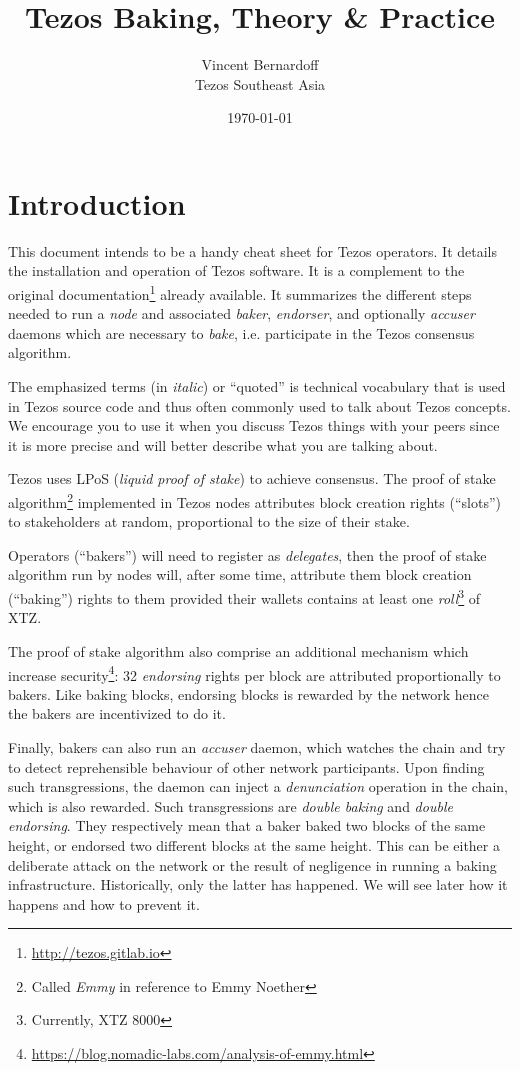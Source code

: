 \documentclass[a4paper,twocolumn,10pt]{article}
\title{Tezos Baking, Theory \& Practice}
\date{\today}
\author{
  Vincent Bernardoff\\
  Tezos Southeast Asia
}
\begin{document}
\twocolumn
\maketitle
\tableofcontents
\section{Introduction}

This document intends to be a handy cheat sheet for Tezos
operators. It details the installation and operation of Tezos
software. It is a complement to the original
documentation\footnote{\url{http://tezos.gitlab.io}} already
available. It summarizes the different steps needed to run a
\emph{node} and associated \emph{baker}, \emph{endorser}, and
optionally \emph{accuser} daemons which are necessary to \emph{bake},
i.e. participate in the Tezos consensus algorithm.

The emphasized terms (in \emph{italic}) or “quoted” is technical
vocabulary that is used in Tezos source code and thus often commonly
used to talk about Tezos concepts. We encourage you to use it when you
discuss Tezos things with your peers since it is more precise and will
better describe what you are talking about.

Tezos uses LPoS (\emph{liquid proof of stake}) to achieve
consensus. The proof of stake algorithm\footnote{Called \emph{Emmy} in
  reference to Emmy Noether} implemented in Tezos nodes attributes
block creation rights (“slots”) to stakeholders at random,
proportional to the size of their stake.

Operators (“bakers”) will need to register as \emph{delegates}, then
the proof of stake algorithm run by nodes will, after some time,
attribute them block creation (“baking”) rights to them provided their
wallets contains at least one \emph{roll}\footnote{Currently, XTZ
  8000} of XTZ.

The proof of stake algorithm also comprise an additional mechanism
which increase
security\footnote{\url{https://blog.nomadic-labs.com/analysis-of-emmy.html}}:
32 \emph{endorsing} rights per block are attributed proportionally to
bakers. Like baking blocks, endorsing blocks is rewarded by the
network hence the bakers are incentivized to do it.

Finally, bakers can also run an \emph{accuser} daemon, which watches
the chain and try to detect reprehensible behaviour of other network
participants. Upon finding such transgressions, the daemon can inject
a \emph{denunciation} operation in the chain, which is also
rewarded. Such transgressions are \emph{double baking} and
\emph{double endorsing}. They respectively mean that a baker baked two
blocks of the same height, or endorsed two different blocks at the
same height. This can be either a deliberate attack on the network or
the result of negligence in running a baking
infrastructure. Historically, only the latter has happened. We will
see later how it happens and how to prevent it.
\end{document}
